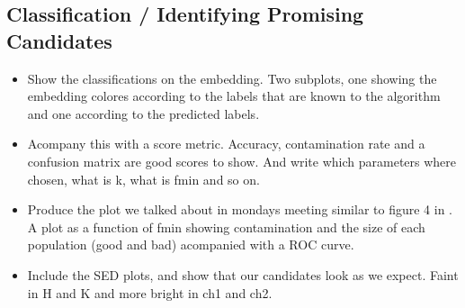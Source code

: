 \subsection{Classification / Identifying Promising Candidates}
\begin{itemize}
    \item Show the classifications on the embedding. Two subplots, one showing the embedding colores according to the labels that are known to the algorithm and one according to the predicted labels.
    \item Acompany this with a score metric. Accuracy, contamination rate and a confusion matrix are good scores to show. And write which parameters where chosen, what is k, what is fmin and so on.
    \item Produce the plot we talked about in mondays meeting similar to figure 4 in \cite{Steinhardt_2020}. A plot as a function of fmin showing contamination and the size of each population (good and bad) acompanied with a ROC curve.
    \item Include the SED plots, and show that our candidates look as we expect. Faint in H and K and more bright in ch1 and ch2.
\end{itemize}
